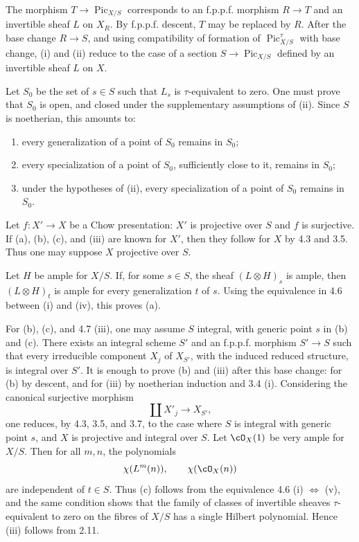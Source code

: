 \documentclass[11pt]{article}
\theoremstyle{plain}
\theoremstyle{definition}
\theoremstyle{remark}
\DeclareMathOperator{\Pic}{Pic}
\newcommand{\longto}{\longrightarrow}
\begin{document}
The morphism $T\to \Pic_{X/S}$ corresponds to an f.p.p.f. morphism $R\to T$ and an invertible sheaf $L$ on $X_R$. By f.p.p.f. descent, $T$ may be replaced by $R$. After the base change $R\to S$, and using compatibility of formation of $\Pic^\tau_{X/S}$ with base change, (i) and (ii) reduce to the case of a section $S\to \Pic_{X/S}$ defined by an invertible sheaf $L$ on $X$.

Let $S_0$ be the set of $s\in S$ such that $L_s$ is $\tau$-equivalent to zero. One must prove that $S_0$ is open, and closed under the supplementary assumptions of (ii). Since $S$ is noetherian, this amounts to:
\begin{enumerate}[label=(\alph*)]
\item every generalization of a point of $S_0$ remains in $S_0$;
\item every specialization of a point of $S_0$, sufficiently close to it, remains in $S_0$;
\item under the hypotheses of (ii), every specialization of a point of $S_0$ remains in $S_0$.
\end{enumerate}

Let $f:X'\to X$ be a Chow presentation: $X'$ is projective over $S$ and $f$ is surjective. If (a), (b), (c), and (iii) are known for $X'$, then they follow for $X$ by 4.3 and 3.5. Thus one may suppose $X$ projective over $S$.

Let $H$ be ample for $X/S$. If, for some $s\in S$, the sheaf $(L\otimes H)_s$ is ample, then $(L\otimes H)_t$ is ample for every generalization $t$ of $s$. Using the equivalence in 4.6 between (i) and (iv), this proves (a).

For (b), (c), and 4.7 (iii), one may assume $S$ integral, with generic point $s$ in (b) and (c). There exists an integral scheme $S'$ and an f.p.p.f. morphism $S'\to S$ such that every irreducible component $X_j$ of $X_{S'}$, with the induced reduced structure, is integral over $S'$. It is enough to prove (b) and (iii) after this base change: for (b) by descent, and for (iii) by noetherian induction and 3.4 (i). Considering the canonical surjective morphism
\[
\coprod X'_j\longto X_{S'},
\]
one reduces, by 4.3, 3.5, and 3.7, to the case where $S$ is integral with generic point $s$, and $X$ is projective and integral over $S$. Let $\cO_X(1)$ be very ample for $X/S$. Then for all $m,n$, the polynomials
\[
\chi(L^m(n)),\qquad \chi(\cO_X(n))
\]
are independent of $t\in S$. Thus (c) follows from the equivalence 4.6 (i) $\Leftrightarrow$ (v), and the same condition shows that the family of classes of invertible sheaves $\tau$-equivalent to zero on the fibres of $X/S$ has a single Hilbert polynomial. Hence (iii) follows from 2.11.
\end{document}

